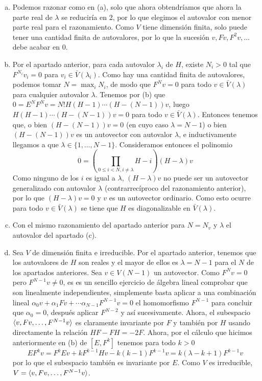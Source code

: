 \documentclass[twoside]{article}
\begin{document}
\begin{solucion}
\begin{enumerate}[(a)]
\item Podemos razonar como en (a), solo que ahora obtendríamos que ahora la parte real de $\lambda$ se reduciría en 2, por lo que elegimos el autovalor con menor parte real para el razonamiento. Como $V$ tiene dimensión finita, solo puede tener una cantidad finita de autovalores, por lo que la sucesión $v,Fv,F^2v,\dots$ debe acabar en 0. 

\item Por el apartado anterior, para cada autovalor $\lambda_i$ de $H$, existe $N_i>0$ tal que $F^{N_i}v_i=0$ para $v_i\in\bar{V}(\lambda_i)$. Como hay una cantidad finita de autovalores, podemos tomar $N=\max_i N_i$, de modo que $F^Nv=0$ para todo $v\in\bar{V}(\lambda)$ para cualquier autovalor $\lambda$. Tenemos por (b) que $0=E^NF^Nv=N! H(H-1)\cdots (H-(N-1))v$, luego $H(H-1)\cdots (H-(N-1))v=0$ para todo $v\in\bar{V}(\lambda)$. Entonces tenemos que, o bien $(H-(N-1))v=0$ (en cuyo caso $\lambda=N-1$) o bien $(H-(N-1))v$ es un autovector con autovalor $\lambda$, e inductivamente llegamos a que $\lambda\in\{1,\dots, N-1\}$. Consideramos entonces el polinomio
\[
0 = \left(\prod_{0 \leq i < N, i \neq \lambda} H-i\right) (H-\lambda)v
\]
Como ninguno de los $i$ es igual a $\lambda$, $(H-\lambda)v$ no puede ser un autovector generalizado con autovalor $\lambda$ (contrarrecíproco del razonamiento anterior), por lo que $(H-\lambda)v=0$ y $v$ es un autovector ordinario. Como esto ocurre para todo $v\in\bar{V}(\lambda)$ se tiene que $H$ es diagonalizable en $\bar{V}(\lambda)$. 

\item Con el mismo razonamiento del apartado anterior para $N=N_v$ y $\lambda$ el autovalor del apartado (c). 

\item Sea $V$ de dimensión finita e irreducible. Por el apartado anterior, tenemos que los autovalores de $H$ son reales y el mayor de ellos es $\lambda=N-1$ para el $N$ de los apartados anteriores. Sea $v\in V(N-1)$ un autovector. Como $F^Nv=0$ pero $F^{N-1}v\neq 0$, es es un sencillo ejercicio de álgebra lineal comprobar que son linealmente independientes, simplemente basta aplicar a una combinación lineal $\alpha_0v+\alpha_1Fv+\cdots \alpha_{N-1}F^{N-1}v=0$ el homomorfismo $F^{N-1}$ para concluir que $\alpha_0=0$, después aplicar $F^{N-2}$ y así sucesivamente. Ahora, el subespacio $\langle{v, Fv,\dots, F^{N-1}v}\rangle$ es claramente invariante por $F$ y también por $H$ usando directamente la relación $HF-FH=-2F$. Ahora, por el cálculo que hicimos anteriormente en (b) de $[E,F^k]$ tenemos para todo $k>0$
\[
EF^k v = F^k Ev + kF^{k-1}Hv -k(k-1)F^{k-1}v = k(\lambda-k+1) F^{k-1}v
\]
por lo que el subespacio también es invariante por $E$. Como $V$ es irreducible, $V=\langle{v, Fv,\dots, F^{N-1}v}\rangle$.


\end{enumerate}
\end{solucion}
\end{document}
